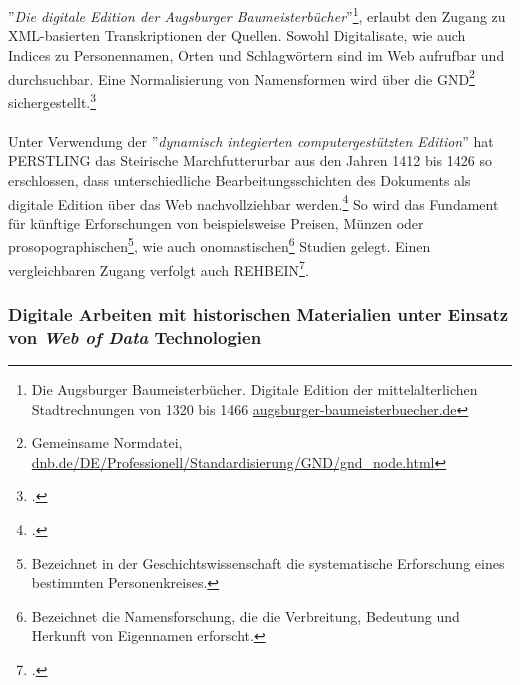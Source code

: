 \documentclass[12pt,a4paper]{article}
\begin{document}
\\
\\
''\textit{Die digitale Edition der Augsburger Baumeisterbücher}''\footnote{Die Augsburger Baumeisterbücher. Digitale Edition der mittelalterlichen Stadtrechnungen von 1320 bis 1466 \protect\url{augsburger-baumeisterbuecher.de}}, erlaubt den Zugang zu XML-basierten Transkriptionen der Quellen. Sowohl Digitalisate, wie auch Indices zu Personennamen, Orten und Schlagwörtern sind im Web aufrufbar und durchsuchbar. Eine Normalisierung von Namensformen wird über die GND\footnote{Gemeinsame Normdatei, \protect\url{dnb.de/DE/Professionell/Standardisierung/GND/gnd_node.html}} sichergestellt.\footcite[][S.109-113]{wurz2016dh}
\\
\\
Unter Verwendung der ''\textit{dynamisch integierten computergestützten Edition}'' hat PERSTLING das Steirische Marchfutterurbar aus den Jahren 1412 bis 1426 so erschlossen, dass unterschiedliche Bearbeitungsschichten des Dokuments als digitale Edition über das Web nachvollziehbar werden.\footcite{PerstlingMatthias2013MDuE} So wird das Fundament für künftige  Erforschungen von beispielsweise Preisen, Münzen oder prosopographischen\footnote{Bezeichnet in der Geschichtswissenschaft die systematische Erforschung eines bestimmten Personenkreises.}, wie  auch onomastischen\footnote{Bezeichnet die Namensforschung, die die Verbreitung, Bedeutung und Herkunft von Eigennamen erforscht.} Studien gelegt. Einen vergleichbaren Zugang verfolgt auch REHBEIN\footcite{RehbeinReconstructing2009}.

\subsubsection{Digitale Arbeiten mit historischen Materialien unter Einsatz von \textit{Web of Data} Technologien}
\end{document}
